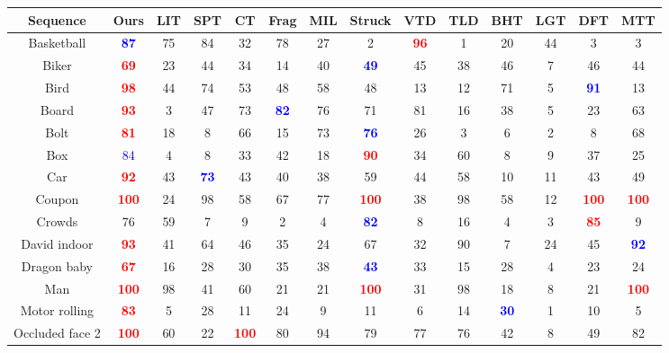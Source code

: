 \documentclass[10pt,twocolumn,letterpaper]{article}
\begin{document}
\begin{table*}
\begin{center}
\begin{tabular}{|c||c|c|c|c|c|c|c|c|c|c|c|c|c|}
  \hline
  {\bf Sequence} & {\bf Ours} & {\bf LIT} & {\bf SPT} & {\bf CT} & {\bf Frag} & {\bf MIL} & {\bf Struck} & {\bf VTD} & {\bf TLD} & {\bf BHT} & {\bf LGT} & {\bf DFT} & {\bf MTT} \\
  \hline \hline
  Basketball & \textcolor{blue}{\bf 87} & 75 & 84 & 32 & 78 & 27 & 2 & \textcolor{red}{\bf 96} & 1 & 20 & 44 & 3 & 3 \\
  Biker & \textcolor{red}{\bf 69} & 23 & 44 & 34 & 14 & 40 & \textcolor{blue}{\bf 49} & 45 & 38 & 46 & 7 & 46 & 44 \\
  Bird & \textcolor{red}{\bf 98} & 44 & 74 & 53 & 48 & 58 & 48 & 13 & 12 & 71 & 5 & \textcolor{blue}{\bf 91} & 13 \\ 
  Board & \textcolor{red}{\bf 93} & 3 & 47 & 73 & \textcolor{blue}{\bf 82} & 76 & 71 & 81 & 16 & 38 & 5 & 23 & 63 \\
  Bolt & \textcolor{red}{\bf 81} & 18 & 8 & 66 & 15 & 73 & \textcolor{blue}{\bf 76} & 26 & 3 & 6 & 2 & 8 & 68 \\
  Box & \textcolor{blue}{84} & 4 & 8 & 33 & 42 & 18 & \textcolor{red}{\bf 90} & 34 & 60 & 8 & 9 & 37 & 25 \\
  Car & \textcolor{red}{\bf 92} & 43 & \textcolor{blue}{\bf 73} & 43 & 40 & 38 & 59 & 44 & 58 & 10 & 11 & 43 & 49 \\
  Coupon & \textcolor{red}{\bf 100} & 24 & 98 & 58 & 67 & 77 & \textcolor{red}{\bf 100} & 38 & 98 & 58 & 12 & \textcolor{red}{\bf 100} & \textcolor{red}{\bf 100} \\
  Crowds & 76 & 59 & 7 & 9 & 2 & 4 & \textcolor{blue}{\bf 82} & 8 & 16 & 4 & 3 & \textcolor{red}{\bf 85} & 9 \\
  David indoor & \textcolor{red}{\bf 93} & 41 & 64 & 46 & 35 & 24 & 67 & 32 & 90 & 7 & 24 & 45 & \textcolor{blue}{\bf 92} \\
  Dragon baby & \textcolor{red}{\bf 67} & 16 & 28 & 30 & 35 & 38 & \textcolor{blue}{\bf 43} & 33 & 15 & 28 & 4 & 23 & 24 \\
  Man & \textcolor{red}{\bf 100} & 98 & 41 & 60 & 21 & 21 & \textcolor{red}{\bf 100} & 31 & 98 & 18 & 8 & 21 & \textcolor{red}{\bf 100} \\
  Motor rolling & \textcolor{red}{\bf 83} & 5 & 28 & 11 & 24 & 9 & 11 & 6 & 14 & \textcolor{blue}{\bf 30} & 1 & 10 & 5 \\
  Occluded face 2 & \textcolor{red}{\bf 100} & 60 & 22 & \textcolor{red}{\bf 100} & 80 & 94 & 79 & 77 & 76 & 42 & 8 & 49 & 82 \\

\end{tabular}
\end{center}
\end{table*}
\end{document}
